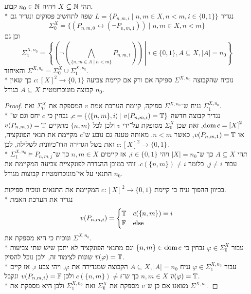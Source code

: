 \question{}
תהי $X \subseteq \mathbb{N}$ ויהיה $n_0 \in \mathbb{N}$ קבוע. \\*
נגדיר $L = \{ P_{n, m, i} \mid n, m \in X, n < m, i \in \{0, 1\}\}$ שפה לתחשיב פסוקים ונגדיר גם
\[
	\Sigma_0^X = \{ (P_{n, m, 0} \leftrightarrow (\lnot P_{n, m, 1})) \mid n, m \in X, n < m \}
\]
וכן גם
\[
	\Sigma_1^{X, n_0} = \left\{\left(\lnot\left(\bigwedge_{\{n, m \in A \mid n < m\}} P_{n, m, i}\right)\right) \middle| i \in \{0, 1\}, A \subseteq X, |A| = n_0\right\}
\]
והאיחוד $\Sigma^{X, n_0} = \Sigma_0^X \cup \Sigma_1^{X, n_0}$. \\*
נוכיח שהקבוצה $\Sigma^{X, n_0}$ ספיקה אם ורק אם קיימת צביעה $c : {[X]}^2 \to \{0, 1\}$ כך שאין קבוצה מונוכרומטית $A \subseteq X$ בגודל $n_0$.
\begin{proof}
	נניח ש־$\Sigma^{X, n_0}$ ספיקה, קיימת הערכת אמת $v$ המספקת את $\Sigma_0^X$ ואת $\Sigma_1^{X, n_0}$. \\*
	נגדיר קבוצה חדשה $c = \{ \langle \{n, m\}, i \rangle \mid v(P_{n, m, i}) = \mathbb{T} \}$,
	נבחין כי $c$ יחס וגם ש־$\operatorname{dom} c = {[X]}^2$, זאת שכן $\Sigma_0^X$ מסופקת על־ידי $v$ ולכן לכל $\{n, m\}$ מתקיים $v(P_{n, m, 0}) = \mathbb{T}$ או $v(P_{n, m, 1}) = \mathbb{T}$, כאשר $n < m$.
	מאותה טענה גם נובע ש־$c$ מקיימת את תנאי הפונקציה, זאת בשל הגרירה הדו־כיוונית לשלילה, לכן $c : {[X]}^2 \to \{0, 1\}$. \\*
	תהי $A \subseteq X$ כך ש־$|X| = n_0$ ויהי $i \in \{0, 1\}$, אז קיימים $n, m \in X$ כך ש־$\Sigma_1^{X, n_0} \models P_{n, m, j}$ עבור $j \ne i$, כלומר $c(\{n, m\}) \ne i$.
	זוהי כמובן ההגדרה לפונקציית צביעה המקיימת את התנאי על אי־מונוכרומטיות קבוצות מגודל $n_0$.

	בכיוון ההפוך נניח כי קיימת $c : {[X]}^2 \to \{0, 1\}$ המקיימת את התנאים ונוכיח ספיקות. \\*
	נגדיר את הערכת האמת
	\[
		v(P_{n, m, i}) = \begin{cases}
			\mathbb{T} & c(\{n, m\}) = i \\
			\mathbb{F} & \text{else}
		\end{cases}
	\]
	ונוכיח כי היא מספקת את $\Sigma^{X, n_0}$. \\*
	עבור $\varphi \in \Sigma_0^X$ נבחין כי $\{n, m\} \in \operatorname{dom} c$ וגם מתנאי הפונקציה לא יתכן שיש שתי צביעות שונות לצימוד זה, ולכן נוכל להסיק $\overline{v}(\varphi) = \mathbb{T}$. \\*
	עבור $\varphi \in \Sigma_1^{X, n_0}$ נניח $A \subseteq X, |A| = n_0$ הקבוצה שמגדירה את $\varphi$, ויהי צבע $i$, אז קיים $n, m \in X$ כך ש־$c(\{n, m\}) \ne i$ ולכן $v(P_{n, m, i}) = \mathbb{F}$ ונקבל $\overline{v}(\varphi) = \mathbb{T}$. \\*
	מצאנו אם כן ש־$v$ מספקת את $\Sigma_0^X$ ואת $\Sigma_1^{X, n_0}$ ולכן היא מספקת את $\Sigma^{X, n_0}$.
\end{proof}

